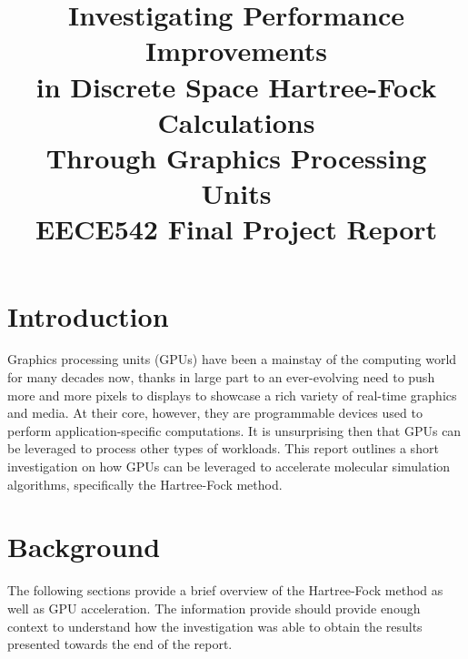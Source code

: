\documentclass[conference, twoside]{IEEEtran}
\begin{document}

\title{Investigating Performance Improvements\\in Discrete Space Hartree-Fock Calculations\\Through Graphics Processing Units\\{\large EECE542 Final Project Report}}
\author{
}

%
{}
\maketitle

\thispagestyle{plain} %
\pagestyle{plain} %

\section{Introduction} %

Graphics processing units (GPUs) have been a mainstay of the computing world for many decades now, thanks in large part to an ever-evolving need to push more and more pixels to displays to showcase a rich variety of real-time graphics and media. At their core, however, they are programmable devices used to perform application-specific computations. It is unsurprising then that GPUs can be leveraged to process other types of workloads. This report outlines a short investigation on how GPUs can be leveraged to accelerate molecular simulation algorithms, specifically the Hartree-Fock method.

\section{Background} %

The following sections provide a brief overview of the Hartree-Fock method as well as GPU acceleration. The information provide should provide enough context to understand how the investigation was able to obtain the results presented towards the end of the report.
\end{document}
